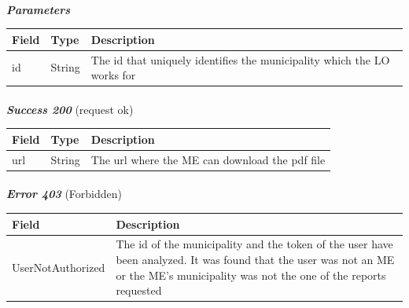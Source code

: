 						\paragraph{}
							\textcolor{myBlue}{\textit{\textbf{Parameters}}}
							\vspace{-2mm}
							\begin{table}[!h]
								\begin{tabular}{L{0.15\textwidth}L{0.15\textwidth}L{0.58\textwidth}}
									\toprule
									\textbf{Field} & \textbf{Type} & \textbf{Description} \\
									\midrule
								 	id & String & The id that uniquely identifies the municipality which the LO works for \\
								 	\bottomrule
								\end{tabular}
							\end{table}
						\paragraph{}
							\textcolor{myGreen}{\textit{\textbf{Success 200}}} (request ok)
							\vspace{-2mm}
							\begin{table}[!h]
								\begin{tabular}{L{0.15\textwidth}L{0.15\textwidth}L{0.58\textwidth}}
									\toprule
									\textbf{Field} & \textbf{Type} & \textbf{Description} \\
									\midrule
									url & String & The url where the ME can download the pdf file \\
								 	\bottomrule
								\end{tabular}
							\end{table}
						\paragraph{}
							\vspace{-5mm}
							\textcolor{myRed}{\textit{\textbf{Error 403}}} (Forbidden)
							\vspace{-2mm}
							\begin{table}[!h]
								\begin{tabular}{L{0.3\textwidth}L{0.62\textwidth}}
									\toprule
									\textbf{Field} & \textbf{Description} \\
									\midrule
								  	UserNotAuthorized & The id of the municipality and the token of the user have been analyzed. It was found that the user was not an ME or the ME's  municipality was not the one of the reports requested \\
								 	\bottomrule
								\end{tabular}
							\end{table}
						\vspace{-5mm}

